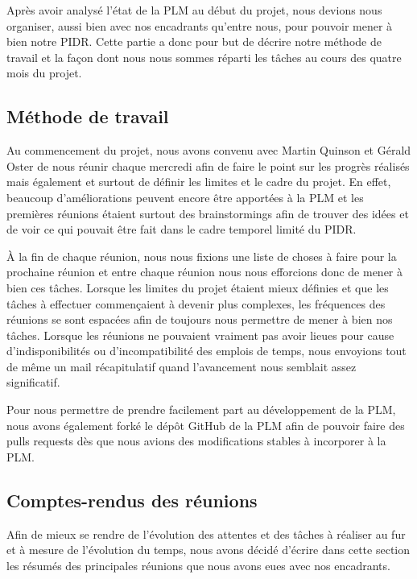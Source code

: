 
Après avoir analysé l'état de la PLM au début du projet, nous devions nous organiser, aussi bien avec nos encadrants qu'entre nous, pour pouvoir mener à bien notre PIDR. Cette partie a donc pour but de décrire notre méthode de travail et la façon dont nous nous sommes réparti les tâches au cours des quatre mois du projet.

\subsection{Méthode de travail}

Au commencement du projet, nous avons convenu avec Martin Quinson et Gérald Oster de nous réunir chaque mercredi afin de faire le point sur les progrès réalisés mais également et surtout de définir les limites et le cadre du projet. En effet, beaucoup d'améliorations peuvent encore être apportées à la PLM et les premières réunions étaient surtout des brainstormings afin de trouver des idées et de voir ce qui pouvait être fait dans le cadre temporel limité du PIDR.


\`A la fin de chaque réunion, nous nous fixions une liste de choses à faire pour la prochaine réunion et entre chaque réunion nous nous efforcions donc de mener à bien ces tâches. Lorsque les limites du projet étaient mieux définies et que les tâches à effectuer commençaient à devenir plus complexes, les fréquences des réunions se sont espacées afin de toujours nous permettre de mener à bien nos tâches. Lorsque les réunions ne pouvaient vraiment pas avoir lieues pour cause d'indisponibilités ou d'incompatibilité des emplois de temps, nous envoyions tout de même un mail récapitulatif quand l'avancement nous semblait assez significatif.


Pour nous permettre de prendre facilement part au développement de la PLM, nous avons également forké le dépôt GitHub de la PLM\cite{OsterGitHub} afin de pouvoir faire des pulls requests dès que nous avions des modifications stables à incorporer à la PLM.


\subsection{Comptes-rendus des réunions}

Afin de mieux se rendre de l'évolution des attentes et des tâches à réaliser au fur et à mesure de l'évolution du temps, nous avons décidé d'écrire dans cette section les résumés des principales réunions que nous avons eues avec nos encadrants.

